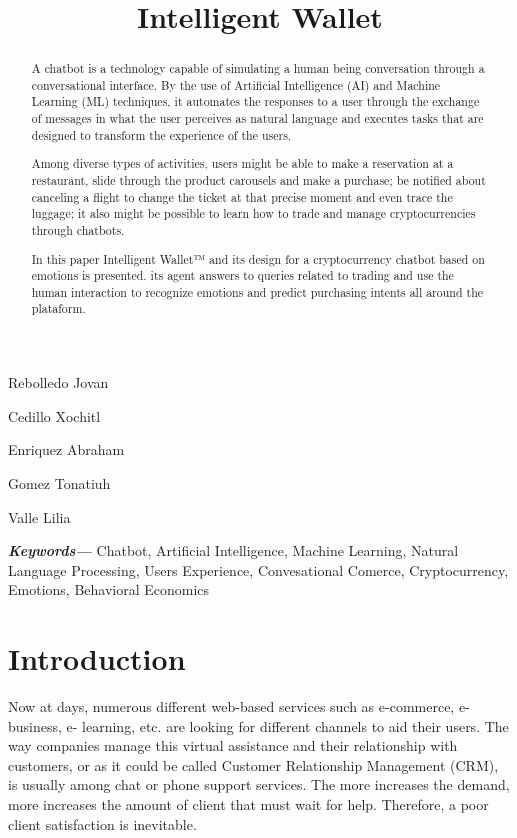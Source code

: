 \documentclass[	DIV=calc,%
							paper=letter,%
							fontsize=12pt%
                            ]{scrartcl}	 					%
\title{Intelligent Wallet}					%
\author{}											%
\date{}																				%
\newcommand{\initial}[1]{%
     \lettrine[lines=3,lhang=0.3,nindent=0em]{
     				\color{DarkGoldenrod}
     				{\textsf{#1}}}{}}
\providecommand{\keywords}[1]
{
  \small	
  \textbf{\textit{Keywords---}} #1
}
\begin{document}
\maketitle
\begin{center}
Rebolledo Jovan
 
Cedillo Xochitl 

Enriquez Abraham 

Gomez Tonatiuh

Valle Lilia 
\end{center}





\newpage
\begin{abstract}
	
{A chatbot is a technology capable of simulating a human being conversation through a conversational interface. By the use of Artificial Intelligence (AI) and Machine Learning (ML) techniques, it automates the responses to a user through the exchange of messages in what the user perceives as natural language and executes tasks that are designed to transform the experience of the users.

Among diverse types of activities, users might be able to make a reservation   at a restaurant, slide through the product carousels and make a purchase; be notified about canceling a flight to change the ticket at that precise moment and even trace the luggage; it also might be possible to learn how to trade and manage cryptocurrencies through chatbots.

In this paper Intelligent Wallet™ and its design for a cryptocurrency chatbot based on emotions is presented. its agent  answers to queries related to trading and use the human interaction to recognize emotions and predict purchasing intents all around the plataform.}

\end{abstract}

\keywords{Chatbot, Artificial Intelligence, Machine Learning, Natural Language Processing, Users Experience, Convesational Comerce, Cryptocurrency, Emotions, Behavioral Economics}

\newpage
\tableofcontents
\newpage
\listoffigures
\newpage

\thispagestyle{fancy} 			%

\section{\label{sec:level1}Introduction}
Now at days, numerous different web-based services such as e-commerce, e-business, e- learning, etc. are looking for different channels to aid their users. The way companies manage this virtual assistance and their relationship with customers, or as it could be called Customer Relationship Management (CRM), is usually among chat or phone support services. The more increases the demand, more increases the amount of client that must wait for help.  Therefore, a poor client satisfaction is inevitable\cite{ranoliya2017chatbot_08126057}.
\end{document}
